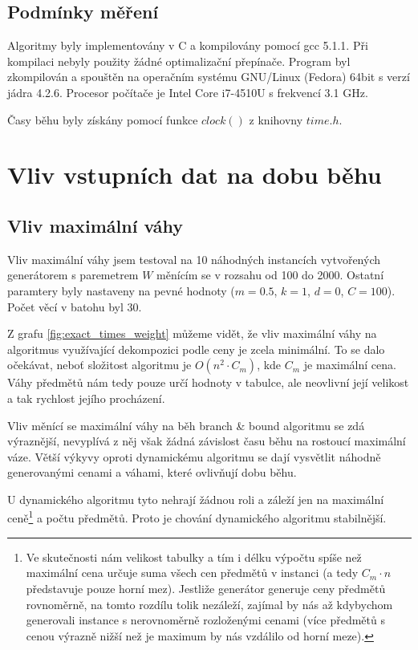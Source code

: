\documentclass[11pt]{article}
\begin{document}
\subsection{Podmínky měření}

Algoritmy byly implementovány v C a kompilovány pomocí gcc 5.1.1. Při kompilaci nebyly použity žádné optimalizační přepínače. Program byl zkompilován a spouštěn na operačním systému GNU/Linux (Fedora) 64bit s verzí jádra 4.2.6. Procesor počítače je Intel Core i7-4510U s frekvencí 3.1 GHz.

Časy běhu byly získány pomocí funkce $clock()$ z knihovny $time.h$.

\section{Vliv vstupních dat na dobu běhu}

\subsection{Vliv maximální váhy}
\label{sec:maxw}
Vliv maximální váhy jsem testoval na 10 náhodných instancích vytvořených generátorem s paremetrem $W$ měnícím se v rozsahu od 100 do 2000. Ostatní paramtery byly nastaveny na pevné hodnoty ($m = 0.5$, $k = 1$, $d = 0$, $C = 100$). Počet věcí v batohu byl 30.

Z grafu \ref{fig:exact_times_weight} můžeme vidět, že vliv maximální váhy na algoritmus využívající dekompozici podle ceny je zcela minimální. To se dalo očekávat, neboť složitost algoritmu je $O(n^2 \cdot C_m)$, kde $C_m$ je maximální cena. Váhy předmětů nám tedy pouze určí hodnoty v tabulce, ale neovlivní její velikost a tak rychlost jejího procházení.

Vliv měnící se maximální váhy na běh branch \& bound algoritmu se zdá výraznější, nevyplívá z něj však žádná závislost času běhu na rostoucí maximální váze. Větší výkyvy oproti dynamickému algoritmu se dají vysvětlit náhodně generovanými cenami a váhami, které ovlivňují dobu běhu. 

U dynamického algoritmu tyto nehrají žádnou roli a záleží jen na maximální ceně\footnote{Ve skutečnosti nám velikost tabulky a tím i délku výpočtu spíše než maximální cena určuje suma všech cen předmětů v instanci (a tedy $C_m \cdot n$ představuje pouze horní mez). Jestliže generátor generuje ceny předmětů rovnoměrně, na tomto rozdílu tolik nezáleží, zajímal by nás až kdybychom generovali instance s nerovnoměrně rozloženými cenami (více předmětů s cenou výrazně nižší než je maximum by nás vzdálilo od horní meze).} a počtu předmětů. Proto je chování dynamického algoritmu stabilnější.
\end{document}
